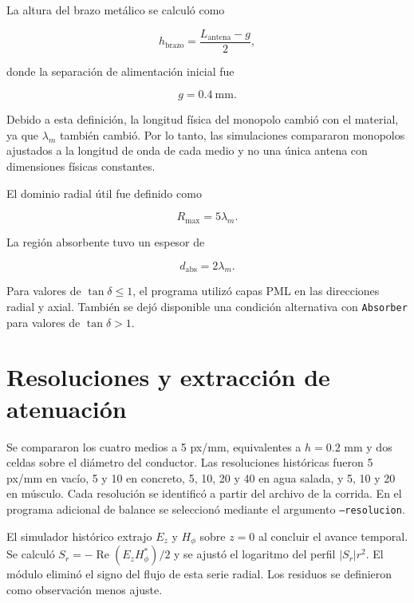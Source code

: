 La altura del brazo metálico se calculó como

\begin{equation}
h_{\mathrm{brazo}}
=
\frac{L_{\mathrm{antena}}-g}{2},
\end{equation}

donde la separación de alimentación inicial fue

\begin{equation}
g=0.4\ \mathrm{mm}.
\end{equation}

Debido a esta definición, la longitud física del monopolo cambió con el material, ya que $\lambda_m$ también cambió. Por lo tanto, las simulaciones compararon monopolos ajustados a la longitud de onda de cada medio y no una única antena con dimensiones físicas constantes.

El dominio radial útil fue definido como

\begin{equation}
R_{\max}=5\lambda_m.
\end{equation}

La región absorbente tuvo un espesor de

\begin{equation}
d_{\mathrm{abs}}=2\lambda_m.
\end{equation}

Para valores de $\tan\delta\leq1$, el programa utilizó capas PML en las direcciones radial y axial. También se dejó disponible una condición alternativa con \texttt{Absorber} para valores de $\tan\delta>1$.


\section{Resoluciones y extracción de atenuación}
Se compararon los cuatro medios a 5 px/mm, equivalentes a $h=0.2$ mm y dos celdas sobre el diámetro del conductor. Las resoluciones históricas fueron 5 px/mm en vacío, 5 y 10 en concreto, 5, 10, 20 y 40 en agua salada, y 5, 10 y 20 en músculo. Cada resolución se identificó a partir del archivo de la corrida. En el programa adicional de balance se seleccionó mediante el argumento \texttt{--resolucion}.

El simulador histórico extrajo $E_z$ y $H_\phi$ sobre $z=0$ al concluir el avance temporal. Se calculó $S_r=-\operatorname{Re}(E_zH_\phi^*)/2$ y se ajustó el logaritmo del perfil $|S_r|r^2$. El módulo eliminó el signo del flujo de esta serie radial. Los residuos se definieron como observación menos ajuste.

